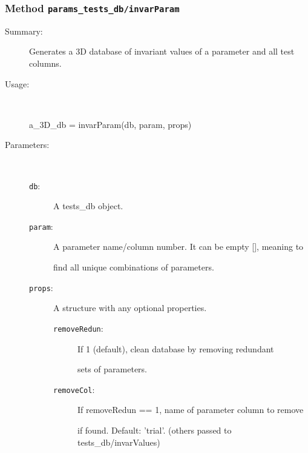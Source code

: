 \subsubsection[Method \texttt{invarParam}]{Method \texttt{params\_tests\_db/invarParam}}%
%
\label{ref_params_tests_db__invarParam}%
\hypertarget{ref_params_tests_db__invarParam}{}%
\begin{description}
\item[Summary:]Generates a 3D database of invariant values of a parameter and all test columns. 
%
\item[Usage:]~%
\begin{lyxcode}%
a\_3D\_db = invarParam(db, param, props)
%
\end{lyxcode}%
%
%
\item[Parameters:]~
\begin{description}%
\item[\texttt{db}:]
 A tests\_db object.
\item[\texttt{param}:]
 A parameter name/column number. It can be empty [], meaning to

find all unique combinations of parameters.
\item[\texttt{props}:]
 A structure with any optional properties.
\begin{description}%
\item[\texttt{removeRedun}:]
 If 1 (default), clean database by removing redundant

sets of parameters.
\item[\texttt{removeCol}:]
 If removeRedun == 1, name of parameter column to remove 

if found. Default: 'trial'.
(others passed to tests\_db/invarValues)
\end{description}%
\end{description}%
%
%
%
%
%
\end{description}
\methodline%
